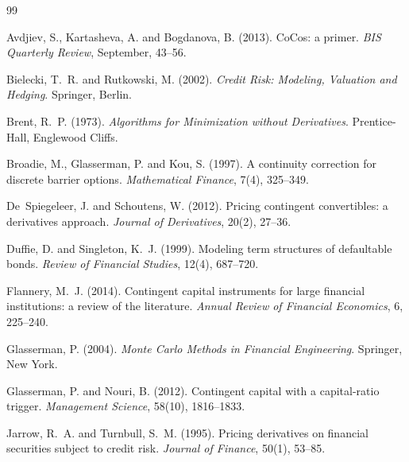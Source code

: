 \begin{thebibliography}{99}

Avdjiev, S., Kartasheva, A. and Bogdanova, B. (2013).
\newblock CoCos: a primer.
\newblock \emph{BIS Quarterly Review}, September, 43--56.

Bielecki, T.~R. and Rutkowski, M. (2002).
\newblock \emph{Credit Risk: Modeling, Valuation and Hedging}.
\newblock Springer, Berlin.

Brent, R.~P. (1973).
\newblock \emph{Algorithms for Minimization without Derivatives}.
\newblock Prentice-Hall, Englewood Cliffs.

Broadie, M., Glasserman, P. and Kou, S. (1997).
\newblock A continuity correction for discrete barrier options.
\newblock \emph{Mathematical Finance}, 7(4), 325--349.

De~Spiegeleer, J. and Schoutens, W. (2012).
\newblock Pricing contingent convertibles: a derivatives approach.
\newblock \emph{Journal of Derivatives}, 20(2), 27--36.

Duffie, D. and Singleton, K.~J. (1999).
\newblock Modeling term structures of defaultable bonds.
\newblock \emph{Review of Financial Studies}, 12(4), 687--720.

Flannery, M.~J. (2014).
\newblock Contingent capital instruments for large financial institutions: a review of the
  literature.
\newblock \emph{Annual Review of Financial Economics}, 6, 225--240.

Glasserman, P. (2004).
\newblock \emph{Monte Carlo Methods in Financial Engineering}.
\newblock Springer, New York.

Glasserman, P. and Nouri, B. (2012).
\newblock Contingent capital with a capital-ratio trigger.
\newblock \emph{Management Science}, 58(10), 1816--1833.

Jarrow, R.~A. and Turnbull, S.~M. (1995).
\newblock Pricing derivatives on financial securities subject to credit risk.
\newblock \emph{Journal of Finance}, 50(1), 53--85.


\end{thebibliography}
